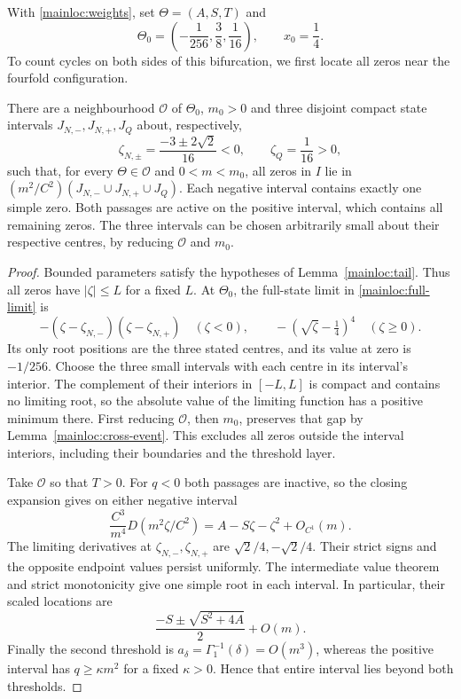With \eqref{mainloc:weights}, set $\Theta=(A,S,T)$ and
\begin{equation}\label{quartic:centre}
 \Theta_0=\left(-\frac1{256},\frac38,\frac1{16}\right),\qquad
 x_0=\frac14.
\end{equation}
To count cycles on both sides of this bifurcation, we first locate
all zeros near the fourfold configuration.

\begin{lemma}
\label{mainloc:all-roots}
There are a neighbourhood $\mathcal O$ of $\Theta_0$, $m_0>0$
and three disjoint compact state intervals $J_{N,-},J_{N,+},J_Q$
about, respectively,
\[
 \zeta_{N,\pm}=\frac{-3\pm2\sqrt2}{16}<0,\qquad
 \zeta_Q=\frac1{16}>0,
\]
such that, for every $\Theta\in\mathcal O$ and $0<m<m_0$, all zeros in
$I$ lie in $(m^2/C^2)(J_{N,-}\cup J_{N,+}\cup J_Q)$.
Each negative interval contains exactly one simple zero. Both passages are
active on the positive interval, which contains all remaining zeros.
The three intervals can be chosen arbitrarily small about their
respective centres, by reducing $\mathcal O$ and $m_0$.
\end{lemma}

\begin{proof}
Bounded parameters satisfy the hypotheses of Lemma~\ref{mainloc:tail}.
Thus all zeros have $|\zeta|\le L$ for a fixed $L$.
At $\Theta_0$, the full-state limit in
\eqref{mainloc:full-limit} is
\[
 -\left(\zeta-\zeta_{N,-}\right)
       \left(\zeta-\zeta_{N,+}\right)\quad(\zeta<0),\qquad
 -\left(\sqrt\zeta-\tfrac14\right)^4\quad(\zeta\ge0).
\]
Its only root positions are the three stated centres, and its value
at zero is $-1/256$. Choose the three small intervals with each centre
in its interval's interior. The complement of their interiors in
$[-L,L]$ is compact and contains no limiting root, so the absolute value
of the limiting function has a positive minimum there. First reducing
$\mathcal O$, then $m_0$, preserves that gap by
Lemma~\ref{mainloc:cross-event}. This excludes all zeros outside the interval
interiors, including their boundaries and the threshold layer.

Take $\mathcal O$ so that $T>0$. For $q<0$ both passages are inactive, so
the closing expansion gives on either negative interval
\[
 \frac{C^3}{m^4}D(m^2\zeta/C^2)
 =A-S\zeta-\zeta^2+O_{C^1}(m).
\]
The limiting derivatives at $\zeta_{N,-},\zeta_{N,+}$ are
$\sqrt2/4,-\sqrt2/4$. Their strict signs and the opposite endpoint
values persist uniformly. The intermediate value theorem and strict
monotonicity give one simple root in each interval. In particular,
their scaled locations are
\[
 \frac{-S\pm\sqrt{S^2+4A}}2+O(m).
\]
Finally the second threshold is
$a_\delta=\Gamma_1^{-1}(\delta)=O(m^3)$, whereas the positive interval
has $q\ge \kappa m^2$ for a fixed $\kappa>0$. Hence that entire interval
lies beyond both thresholds.
\end{proof}

